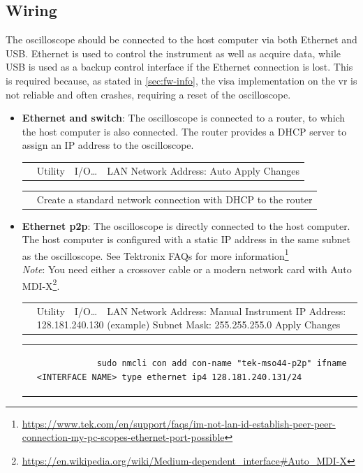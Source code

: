 \documentclass[a4paper,english,twoside,10pt]{article}
\newenvironment{scopesetting}{
	\parskip=5pt\par\nopagebreak\centering\sffamily%
	\begin{tabular}{>{\columncolor{cyan!15}}m{2em} >{\columncolor{cyan!15}}m{.8\textwidth}}
	 & 
} {
	\\
	\end{tabular}
	\par\noindent\ignorespacesafterend%
}
\newenvironment{laptopsetting}{
	\parskip=5pt\par\nopagebreak\centering\sffamily%
	\begin{tabular}{>{\columncolor{red!15}}m{2em} >{\columncolor{red!15}}m{.8\textwidth}}
	 & 
} {
	\\
	\end{tabular}
	\par\noindent\ignorespacesafterend%
}
\begin{document}
\subsection{Wiring}
The oscilloscope should be connected to the host computer via both Ethernet and USB. Ethernet is used to control the instrument as well as acquire data, while USB is used as a backup control interface if the Ethernet connection is lost. This is required because, as stated in \ref{sec:fw-info}, the visa implementation on the \gls{vr} is not reliable and often crashes, requiring a reset of the oscilloscope.
\begin{itemize}
	\item \textbf{Ethernet and switch}: The oscilloscope is connected to a router, to which the host computer is also connected. The router provides a DHCP server to assign an IP address to the oscilloscope.
	\begin{scopesetting}
		Utility\ \rightarrow\  I/O\ldots\ \rightarrow\  LAN\newline
		Network Address: Auto\newline
		Apply Changes
	\end{scopesetting}
	\begin{laptopsetting}
		Create a standard network connection with DHCP to the router
	\end{laptopsetting}

	\item \textbf{Ethernet p2p}: The oscilloscope is directly connected to the host computer. The host computer is configured with a static IP address in the same subnet as the oscilloscope. See Tektronix FAQs for more information\footnote{\url{https://www.tek.com/en/support/faqs/im-not-lan-id-establish-peer-peer-connection-my-pc-scopes-ethernet-port-possible}}\\
	\textit{Note}: You need either a crossover cable or a modern network card with Auto MDI-X\footnote{\url{https://en.wikipedia.org/wiki/Medium-dependent\_interface\#Auto\_MDI-X}}.
	\begin{scopesetting}
		Utility\ \rightarrow\  I/O\ldots\ \rightarrow\  LAN\newline
		Network Address: Manual\newline
		Instrument IP Address: 128.181.240.130 (example)\newline
		Subnet Mask: 255.255.255.0\newline
		Apply Changes
	\end{scopesetting}
	\begin{laptopsetting}
		\begin{verbatim}
			sudo nmcli con add con-name "tek-mso44-p2p" ifname <INTERFACE NAME> type ethernet ip4 128.181.240.131/24
		\end{verbatim}
	\end{laptopsetting}


\end{itemize}
\end{document}
